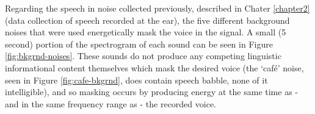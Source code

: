 %


Regarding the speech in noise collected previously, described in Chater \ref{chapter2} (data collection of speech recorded at the ear), the five different background noises that were used energetically mask the voice in the signal.  A small (5 second) portion of the spectrogram of each sound can be seen in Figure \ref{fig:bkgrnd-noises}.  These sounds do not produce any competing linguistic informational content themselves which mask the desired voice (the `caf\'{e}' noise, seen in Figure \ref{fig:cafe-bkgrnd}, does contain speech babble, none of it intelligible), and so masking occurs by producing energy at the same time as - and in the same frequency range as - the recorded voice.

